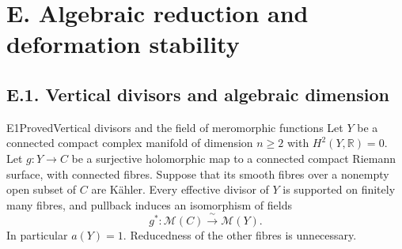 
\section{E. Algebraic reduction and deformation stability}

\subsection{E.1. Vertical divisors and algebraic dimension}


\label{sec:E}

\begin{statement}{E1}{Proved}{Vertical divisors and the field of meromorphic functions}
Let $Y$ be a connected compact complex manifold of dimension $n\geq2$
with $H^2(Y,\mathbb R)=0$. Let $g:Y\to C$ be a surjective holomorphic
map to a connected compact Riemann surface, with connected fibres.
Suppose that its smooth fibres over a nonempty open subset of $C$ are
K\"ahler. Every effective divisor of $Y$ is supported on finitely many
fibres, and pullback induces an isomorphism of fields
\[
 g^*: \mathcal M(C)\xrightarrow{\ \sim\ }\mathcal M(Y).
\]
In particular $a(Y)=1$. Reducedness of the other fibres is unnecessary.
\end{statement}
